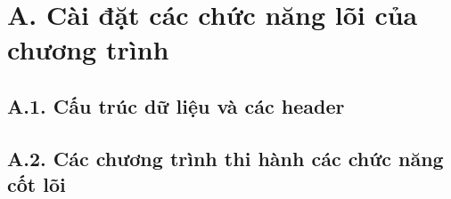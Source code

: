 \section*{A. Cài đặt các chức năng lõi của chương trình}
\subsection*{A.1. Cấu trúc dữ liệu và các header}










\subsection*{A.2. Các chương trình thi hành các chức năng cốt lõi}









